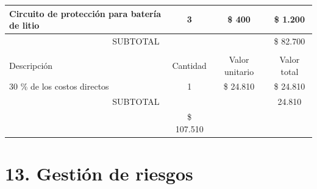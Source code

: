 \documentclass[
11pt, %
codirector, %
]{charter}
\begin{document}
\begin{table}[htpb]
\begin{tabularx}{\linewidth}{@{}|X|c|r|r|@{}}
Circuito de protección para batería de litio &
  \multicolumn{1}{c|}{3} &
  \multicolumn{1}{c|}{\$ 400} &
  \multicolumn{1}{c|}{\$ 1.200} \\ \hline

\multicolumn{3}{|c|}{SUBTOTAL} &
  \multicolumn{1}{c|}{\$ 82.700} \\ \hline
\rowcolor[HTML]{C0C0C0} 
\multicolumn{4}{|c|}{\cellcolor[HTML]{C0C0C0}COSTOS INDIRECTOS} \\ \hline
\rowcolor[HTML]{C0C0C0} 
Descripción &
  \multicolumn{1}{c|}{\cellcolor[HTML]{C0C0C0}Cantidad} &
  \multicolumn{1}{c|}{\cellcolor[HTML]{C0C0C0}Valor unitario} &
  \multicolumn{1}{c|}{\cellcolor[HTML]{C0C0C0}Valor total} \\ \hline
   
   30 \% de los costos directos   &
  \multicolumn{1}{c|}{1} &
  \multicolumn{1}{c|}{\$ 24.810} &
  \multicolumn{1}{c|}{\$ 24.810} \\ \hline

\multicolumn{3}{|c|}{SUBTOTAL} &
  \multicolumn{1}{c|}{24.810} \\ \hline
\rowcolor[HTML]{C0C0C0}
\multicolumn{3}{|c|}{TOTAL} & \$ 107.510
   \\ \hline
\end{tabularx}%
\end{table}


\section{13. Gestión de riesgos}
\label{sec:riesgos}
\end{document}

